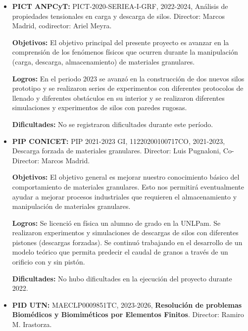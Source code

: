 \documentclass[a4paper,11pt,twoside,final,titlepage,onecolumn,openright]{report}
\begin{document}
\begin{itemize}
\item \textbf{PICT ANPCyT:} PICT-2020-SERIEA-I-GRF, 2022-2024, Análisis de propiedades tensionales en carga y descarga de silos. Director: Marcos Madrid, codirector: Ariel Meyra.

    \textbf{Objetivos:} El objetivo principal del presente proyecto es avanzar en la comprensión de los fenómenos físicos que ocurren durante la manipulación (carga, descarga, almacenamiento) de materiales granulares. 

    \textbf{Logros:} En el periodo 2023 se avanzó en la construcción de dos nuevos silos prototipo y se realizaron series de experimentos con diferentes protocolos de llenado y diferentes obstáculos en su interior y se realizaron diferentes simulaciones y experimentos de silos con paredes rugosas.

    \textbf{Dificultades:} No se registraron dificultades durante este período.

\item \textbf{PIP CONICET:} PIP 2021-2023 GI, 11220200100717CO, 2021-2023, Descarga forzada de materiales granulares. Director: Luis Pugnaloni, Co-Director: Marcos Madrid.

    \textbf{Objetivos:} El objetivo general es mejorar nuestro conocimiento básico del comportamiento de materiales granulares. Esto nos permitirá eventualmente ayudar a mejorar procesos industriales que requieren el almacenamiento y manipulación de materiales granulares.

    \textbf{Logros:} Se licenció en física un alumno de grado en la UNLPam. Se realizaron experimentos y simulaciones de descargas de silos con diferentes pistones (descargas forzadas). Se continuó trabajando en el desarrollo de un modelo teórico que permita predecir el caudal de granos a través de un orificio con y sin pistón.

    \textbf{Dificultades:} No hubo dificultades en la ejecución del proyecto durante 2022.

\item {\bf PID UTN:} MAECLP0009851TC, 2023-2026, {\bf Resolución de problemas Biomédicos y Biomiméticos por Elementos Finitos}. Director: Ramiro M. Irastorza.
 

\end{itemize}
\end{document}
